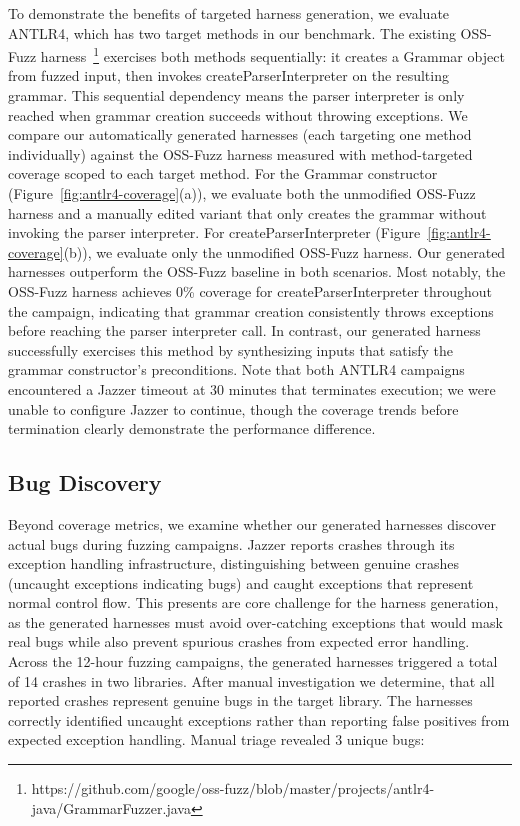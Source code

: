 %
\par

To demonstrate the benefits of targeted harness generation, we evaluate ANTLR4, which has two target methods in our benchmark. The existing OSS-Fuzz harness~\footnote{https://github.com/google/oss-fuzz/blob/master/projects/antlr4-java/GrammarFuzzer.java} exercises both methods sequentially: it creates a Grammar object from fuzzed input, then invokes createParserInterpreter on the resulting grammar. This sequential dependency means the parser interpreter is only reached when grammar creation succeeds without throwing exceptions.
We compare our automatically generated harnesses (each targeting one method individually) against the OSS-Fuzz harness measured with method-targeted coverage scoped to each target method. For the Grammar constructor (Figure~\ref{fig:antlr4-coverage}(a)), we evaluate both the unmodified OSS-Fuzz harness and a manually edited variant that only creates the grammar without invoking the parser interpreter. For createParserInterpreter (Figure~\ref{fig:antlr4-coverage}(b)), we evaluate only the unmodified OSS-Fuzz harness.
Our generated harnesses outperform the OSS-Fuzz baseline in both scenarios. Most notably, the OSS-Fuzz harness achieves 0\% coverage for createParserInterpreter throughout the campaign, indicating that grammar creation consistently throws exceptions before reaching the parser interpreter call. In contrast, our generated harness successfully exercises this method by synthesizing inputs that satisfy the grammar constructor's preconditions. Note that both ANTLR4 campaigns encountered a Jazzer timeout at 30 minutes that terminates execution; we were unable to configure Jazzer to continue, though the coverage trends before termination clearly demonstrate the performance difference.
%
\subsection{Bug Discovery}%
\label{subsec:bug-discovery}
Beyond coverage metrics, we examine whether our generated harnesses discover actual bugs during fuzzing campaigns. Jazzer reports crashes through its exception handling infrastructure, distinguishing between genuine crashes (uncaught exceptions indicating bugs) and caught exceptions that represent normal control flow. This presents are core challenge for the harness generation, as the generated harnesses must avoid over-catching exceptions that would mask real bugs while also prevent spurious crashes from expected error handling.
Across the 12-hour fuzzing campaigns, the generated harnesses triggered a total of 14 crashes in two libraries. After manual investigation we determine, that all reported crashes represent genuine bugs in the target library. The harnesses correctly identified uncaught exceptions rather than reporting false positives from expected exception handling. Manual triage revealed 3 unique bugs:

